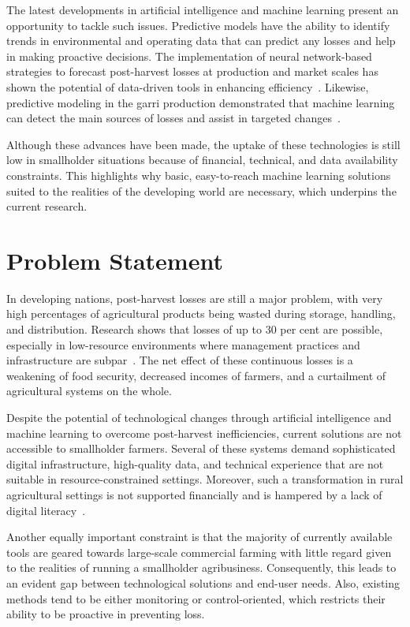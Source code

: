 The latest developments in artificial intelligence and machine learning present an opportunity to
tackle such issues. Predictive models have the ability to identify trends in environmental and
operating data that can predict any losses and help in making proactive decisions. The
implementation of neural network-based strategies to forecast post-harvest losses at production
and market scales has shown the potential of data-driven tools in enhancing
efficiency~\cite{guo2025predicting}. Likewise, predictive modeling in the garri production
demonstrated that machine learning can detect the main sources of losses and assist in targeted
changes~\cite{adewumi2025artificial}.

Although these advances have been made, the uptake of these technologies is still low in
smallholder situations because of financial, technical, and data availability constraints. This
highlights why basic, easy-to-reach machine learning solutions suited to the realities of the
developing world are necessary, which underpins the current research.


\section{Problem Statement}

In developing nations, post-harvest losses are still a major problem, with very high percentages
of agricultural products being wasted during storage, handling, and distribution. Research shows
that losses of up to 30 per cent are possible, especially in low-resource environments where
management practices and infrastructure are subpar~\cite{affognon2015unpacking}. The net effect
of these continuous losses is a weakening of food security, decreased incomes of farmers, and a
curtailment of agricultural systems on the whole.

Despite the potential of technological changes through artificial intelligence and machine learning
to overcome post-harvest inefficiencies, current solutions are not accessible to smallholder
farmers. Several of these systems demand sophisticated digital infrastructure, high-quality data,
and technical experience that are not suitable in resource-constrained settings. Moreover, such a
transformation in rural agricultural settings is not supported financially and is hampered by a
lack of digital literacy~\cite{wolfert2017big}.

Another equally important constraint is that the majority of currently available tools are geared
towards large-scale commercial farming with little regard given to the realities of running a
smallholder agribusiness. Consequently, this leads to an evident gap between technological
solutions and end-user needs. Also, existing methods tend to be either monitoring or
control-oriented, which restricts their ability to be proactive in preventing loss.

